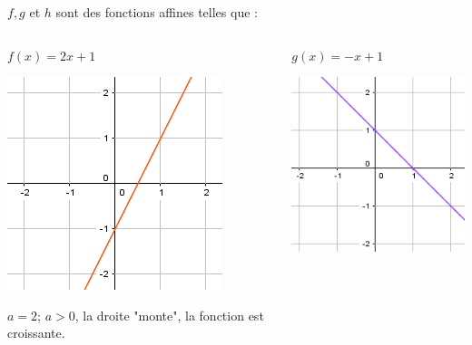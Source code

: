 \documentclass[xcolor={dvipsnames}]{beamer}
\begin{document}
\begin{frame}

	\begin{myex}
		$f, g$ et $h$ sont des fonctions affines telles que :
	\end{myex}
	
	\begin{columns}[c]
		
		
		\begin{column}{3.7cm}
			
			\begin{exampleblock}{$f(x)=2x+1$}
				
				
				\begin{center}
					\includegraphics[scale=0.5]{ex2_1}
				\end{center}		
				
				$a=2$; $a>0$, la droite "monte", la fonction est croissante. 	
			\end{exampleblock}
			
		\end{column}
		
		\begin{column}{3.7cm}
			\begin{exampleblock}{$g(x)=-x+1$}
			
				\begin{center}
					\includegraphics[scale=0.5]{ex2_2}
				\end{center}		
			

\end{exampleblock}
\end{column}
\end{columns}
\end{frame}
\end{document}
